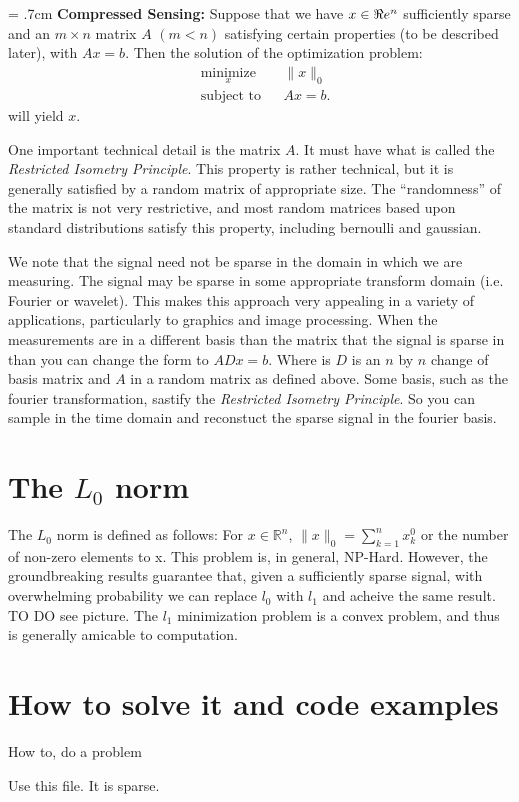 \hangindent = .7cm
\setlength{\parindent}{.7cm}
\textbf{Compressed Sensing:} Suppose that we have $x \in \Re e^n$  sufficiently sparse and an $m \times n$ matrix $A$ $(m < n)$ satisfying certain properties (to be described later), with $Ax = b$. Then the solution of the optimization problem:
\begin{equation*}
\begin{aligned}
& \underset{x}{\text{minimize}}
& & \|x\|_0\\
& \text{subject to}
& & Ax = b.
\end{aligned}
\end{equation*}
 will yield $x$.
\setlength{\parindent}{0cm}

One important technical detail is the matrix $A$.  It must have what is called the \emph{Restricted Isometry Principle}. This property is rather technical, but it is generally satisfied by a random matrix of appropriate size. The ``randomness'' of the matrix is not very restrictive, and most random matrices based upon standard distributions satisfy this property, including bernoulli and gaussian.

We note that the signal need not be sparse in the domain in which we are measuring. The signal may be sparse in some appropriate transform domain (i.e. Fourier or wavelet). This makes this approach very appealing in a variety of applications, particularly to graphics and image processing. When the measurements are in a different basis than the matrix that the signal is sparse in than you can change the form to $ADx = b$. Where is $D$ is an $n$ by $n$ change of basis matrix and $A$ in a random matrix as defined above. Some basis, such as the fourier transformation, sastify the \emph{Restricted Isometry Principle}. So you can sample in the time domain and reconstuct the sparse signal in the fourier basis.

\section*{The $L_0$ norm}

The $L_0$ norm is defined as follows: For $x \in \mathbb{R}^n$, $\|x\|_0=\sum_{k=1}^n{x_k^0}$ or the number of non-zero elements to x. This problem is, in general, NP-Hard. However, the groundbreaking results  guarantee that, given a sufficiently sparse signal, with overwhelming probability we can replace $l_0$ with $l_1$ and acheive the same result. 
TO DO see picture.
The $l_1$ minimization problem is a convex problem, and thus is generally amicable to computation.

\section*{How to solve it and code examples}


\begin{problem}
How to, do a problem 
\end{problem}

\begin{problem}
Use this file. It is sparse.  
\end{problem}



